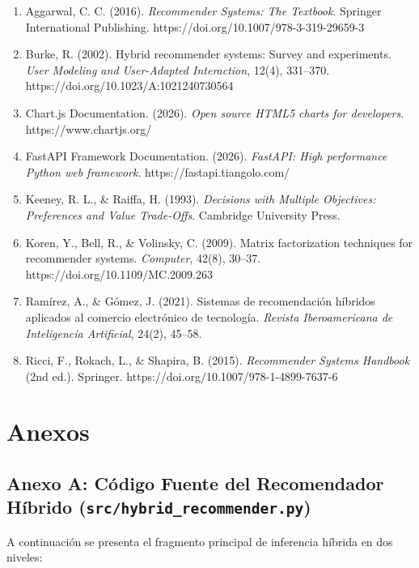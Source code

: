 \documentclass[12pt,a4paper]{article}
\begin{document}
\begin{enumerate}
    \item Aggarwal, C. C. (2016). \textit{Recommender Systems: The Textbook}. Springer International Publishing. https://doi.org/10.1007/978-3-319-29659-3
    \item Burke, R. (2002). Hybrid recommender systems: Survey and experiments. \textit{User Modeling and User-Adapted Interaction}, 12(4), 331--370. https://doi.org/10.1023/A:1021240730564
    \item Chart.js Documentation. (2026). \textit{Open source HTML5 charts for developers}. https://www.chartjs.org/
    \item FastAPI Framework Documentation. (2026). \textit{FastAPI: High performance Python web framework}. https://fastapi.tiangolo.com/
    \item Keeney, R. L., \& Raiffa, H. (1993). \textit{Decisions with Multiple Objectives: Preferences and Value Trade-Offs}. Cambridge University Press.
    \item Koren, Y., Bell, R., \& Volinsky, C. (2009). Matrix factorization techniques for recommender systems. \textit{Computer}, 42(8), 30--37. https://doi.org/10.1109/MC.2009.263
    \item Ramírez, A., \& Gómez, J. (2021). Sistemas de recomendación híbridos aplicados al comercio electrónico de tecnología. \textit{Revista Iberoamericana de Inteligencia Artificial}, 24(2), 45--58.
    \item Ricci, F., Rokach, L., \& Shapira, B. (2015). \textit{Recommender Systems Handbook} (2nd ed.). Springer. https://doi.org/10.1007/978-1-4899-7637-6
\end{enumerate}

\section{Anexos}

\subsection{Anexo A: Código Fuente del Recomendador Híbrido (\texttt{src/hybrid\_recommender.py})}

A continuación se presenta el fragmento principal de inferencia híbrida en dos niveles:
\end{document}
